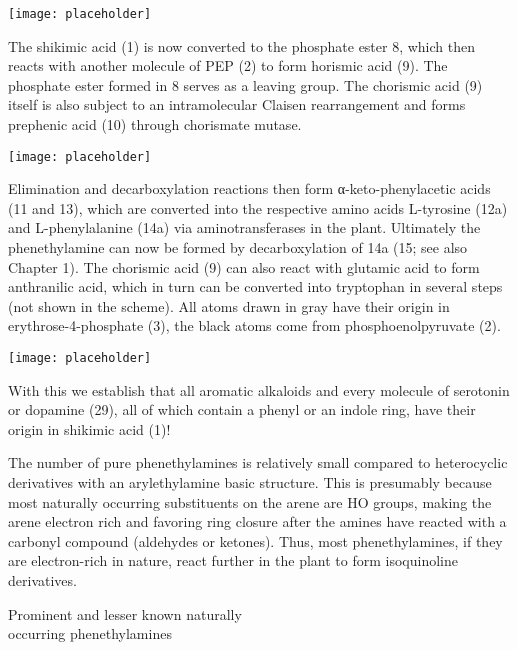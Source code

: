 \begin{center}\texttt{[image: placeholder]}\end{center}

The shikimic acid (1) is now converted to the phosphate ester 8, which then reacts with another molecule of PEP (2) to form horismic acid (9). The phosphate ester formed in 8 serves as a leaving group. The chorismic acid (9) itself is also subject to an intramolecular Claisen rearrangement and forms prephenic acid (10) through chorismate mutase.

\begin{center}\texttt{[image: placeholder]}\end{center}
\clearpage

Elimination and decarboxylation reactions then form α-keto-phenylacetic acids (11 and 13), which are converted into the respective amino acids L-tyrosine (12a) and L-phenylalanine (14a) via aminotransferases in the plant. Ultimately the phenethylamine can now be formed by decarboxylation of 14a (15; see also Chapter 1). The chorismic acid (9) can also react with glutamic acid to form anthranilic acid, which in turn can be converted into tryptophan in several steps (not shown in the scheme). All atoms drawn in gray have their origin in erythrose-4-phosphate (3), the black atoms come from phosphoenolpyruvate (2).

\begin{center}\texttt{[image: placeholder]}\end{center}

With this we establish that all aromatic alkaloids and every molecule of serotonin or dopamine (29), all of which contain a phenyl or an indole ring, have their origin in shikimic acid (1)!

The number of pure phenethylamines is relatively small compared to heterocyclic derivatives with an arylethylamine basic structure. This is presumably because most naturally occurring substituents on the arene are HO groups, making the arene electron rich and favoring ring closure after the amines have reacted with a carbonyl compound (aldehydes or ketones). Thus, most phenethylamines, if they are electron-rich in nature, react further in the plant to form isoquinoline derivatives.

\begin{center}
Prominent and lesser known naturally\\
occurring phenethylamines
\end{center}
\bigbreak

